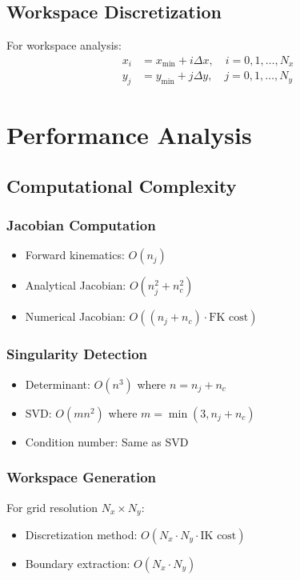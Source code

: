 \documentclass[11pt,a4paper]{article}
\begin{document}
\subsection{Workspace Discretization}
For workspace analysis:
\begin{align}
x_i &= x_{\min} + i \Delta x, \quad i = 0, 1, \ldots, N_x \\
y_j &= y_{\min} + j \Delta y, \quad j = 0, 1, \ldots, N_y
\end{align}

\section{Performance Analysis}

\subsection{Computational Complexity}

\subsubsection{Jacobian Computation}
\begin{itemize}
    \item Forward kinematics: $O(n_j)$
    \item Analytical Jacobian: $O(n_j^2 + n_c^2)$  
    \item Numerical Jacobian: $O((n_j + n_c) \cdot \text{FK cost})$
\end{itemize}

\subsubsection{Singularity Detection}
\begin{itemize}
    \item Determinant: $O(n^3)$ where $n = n_j + n_c$
    \item SVD: $O(mn^2)$ where $m = \min(3, n_j + n_c)$
    \item Condition number: Same as SVD
\end{itemize}

\subsubsection{Workspace Generation}
For grid resolution $N_x \times N_y$:
\begin{itemize}
    \item Discretization method: $O(N_x \cdot N_y \cdot \text{IK cost})$
    \item Boundary extraction: $O(N_x \cdot N_y)$
\end{itemize}
\end{document}
